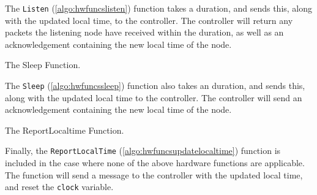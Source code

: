 The \texttt{Listen} (\autoref{algo:hwfuncslisten}) function takes a duration, and sends this, along with the updated local time, to the controller. The controller will return any packets the listening node have received within the duration, as well as an acknowledgement containing the new local time of the node.\medbreak

\begin{algorithm}[ht]
    \DontPrintSemicolon
    
    
    \caption{The Sleep Function.}
    \label{algo:hwfuncssleep}
\end{algorithm}

The \texttt{Sleep} (\autoref{algo:hwfuncssleep}) function also takes an duration, and sends this, along with the updated local time to the controller. The controller will send an acknowledgement containing the new local time of the node.\medbreak

\begin{algorithm}[ht]
    \DontPrintSemicolon
    
    
    \caption{The ReportLocaltime Function.}
    \label{algo:hwfuncsupdatelocaltime}
\end{algorithm}

Finally, the \texttt{ReportLocalTime} (\autoref{algo:hwfuncsupdatelocaltime}) function is included in the case where none of the above hardware functions are applicable. The function will send a message to the controller with the updated local time, and reset the \texttt{clock} variable.
